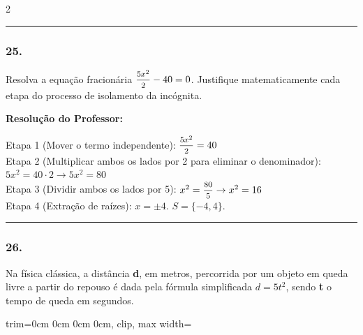 \begin{multicols*}{2}
\par\vspace{\espacoQuestao}

\noindent\textcolor{CorLinha}{\rule{\linewidth}{0.5pt}} 
\par\vspace{\espacoPreQuestao}
\subsubsection*{25.} Resolva a equação fracionária $ \mfrac{5x^2}{2} - 40 = 0 $. Justifique matematicamente cada etapa do processo de isolamento da incógnita.

\ifgabarito
    \begin{tcolorbox}[colback=CorTitUm!5, colframe=CorTitUm, boxrule=1pt, arc=4pt, left=6pt, right=6pt, top=6pt, bottom=6pt]
    \small\textbf{\textcolor{CorTitUm}{Resolução do Professor:}}\par\vspace{0.1cm}
    \color{CinzaEscuro}
    Etapa 1 (Mover o termo independente): $\mfrac{5x^2}{2} = 40$\\
    Etapa 2 (Multiplicar ambos os lados por 2 para eliminar o denominador): $5x^2 = 40 \cdot 2 \rightarrow 5x^2 = 80$\\
    Etapa 3 (Dividir ambos os lados por 5): $x^2 = \mfrac{80}{5} \rightarrow x^2 = 16$\\
    Etapa 4 (Extração de raízes): $x = \pm 4$. $S = \{-4, 4\}$.
    \end{tcolorbox}
\fi

\par\vspace{\espacoQuestao}

\noindent\textcolor{CorLinha}{\rule{\linewidth}{0.5pt}} 
\par\vspace{\espacoPreQuestao}
\subsubsection*{26.} Na física clássica, a distância \textbf{d}, em metros, percorrida por um objeto em queda livre a partir do repouso é dada pela fórmula simplificada $ d = 5t^2 $, sendo \textbf{t} o tempo de queda em segundos.

\begin{center}
\begin{adjustbox}{trim=0cm 0cm 0cm 0cm, clip, max width=\larguraTikz}
\end{adjustbox}
\end{center}
\end{multicols*}
